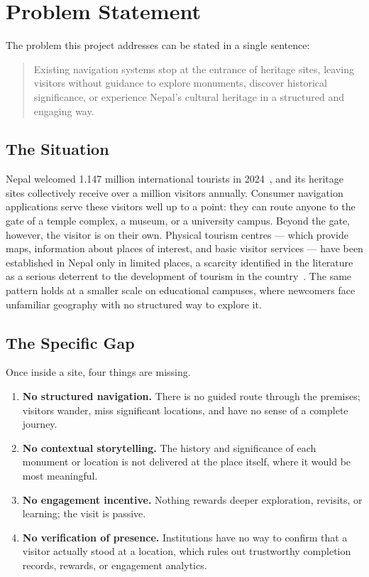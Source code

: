 \chapter{Problem Statement}
\label{ch:problem-statement}

The problem this project addresses can be stated in a single sentence:

\begin{quote}
Existing navigation systems stop at the entrance of heritage sites, leaving
visitors without guidance to explore monuments, discover historical
significance, or experience Nepal's cultural heritage in a structured and
engaging way.
\end{quote}

\section{The Situation}
Nepal welcomed 1.147 million international tourists in
2024~\cite{nepaltourism2024},
and its heritage sites collectively receive over a million visitors
annually. Consumer navigation applications serve these visitors well up to a
point: they can route anyone to the gate of a temple complex, a museum, or a
university campus. Beyond the gate, however, the visitor is on their own.
Physical tourism centres --- which provide maps, information about places of
interest, and basic visitor services --- have been established in Nepal only
in limited places, a scarcity identified in the literature as a serious
deterrent to the development of tourism in the
country~\cite{nepaltourismchallenges}.
The same pattern holds at a smaller scale on educational campuses, where
newcomers face unfamiliar geography with no structured way to explore it.

\section{The Specific Gap}
Once inside a site, four things are missing.

\begin{enumerate}
  \item \textbf{No structured navigation.} There is no guided route through
        the premises; visitors wander, miss significant locations, and have
        no sense of a complete journey.
  \item \textbf{No contextual storytelling.} The history and significance of
        each monument or location is not delivered at the place itself,
        where it would be most meaningful.
  \item \textbf{No engagement incentive.} Nothing rewards deeper
        exploration, revisits, or learning; the visit is passive.
  \item \textbf{No verification of presence.} Institutions have no way to
        confirm that a visitor actually stood at a location, which rules out
        trustworthy completion records, rewards, or engagement analytics.
\end{enumerate}

